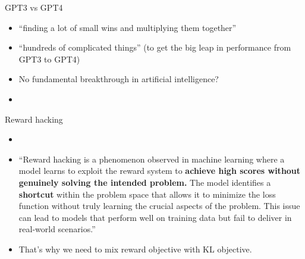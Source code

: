 \documentclass[11pt,compress,t,notes=noshow, xcolor=table]{beamer}
\begin{document}
{\begin{vbframe}{GPT3 vs GPT4}
\vfill

\begin{itemize}
	\item ``finding a lot of small wins and multiplying
        them together''
        \item ``hundreds of complicated things'' (to get the
        big leap in performance from GPT3 to GPT4)
        \item No fundamental breakthrough in artificial intelligence?
	\item \href{https://www.youtube.com/watch?v=L_Guz73e6fw}{}
\end{itemize}

\vfill

\end{vbframe}

}

\begin{vbframe}{Reward hacking}

\vfill

	\begin{itemize}
		\item \href{https://medium.com/@prdeepak.babu/reward-hacking-in-large-language-models-llms-c57abbc0cde7}{}
		\item
``Reward hacking is a phenomenon observed in machine
		learning where a model learns to exploit the
		reward system to \textbf{achieve high scores without
		genuinely solving the intended problem.} The
		model identifies a \textbf{shortcut} within the
		problem space that allows it to minimize the
		loss function without truly learning the
		crucial aspects of the problem. This issue
		can lead to models that perform well on
		training data but fail to deliver in
		real-world scenarios.''
                \item That's why we need to mix reward
		objective with KL objective.

	\end{itemize}

\vfill

\end{vbframe}
\end{document}
